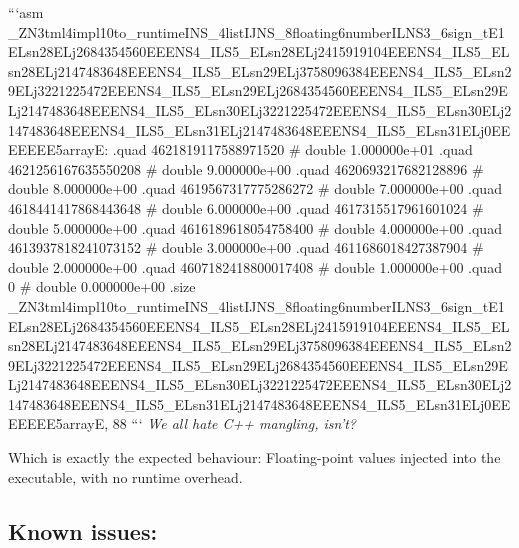 ```asm \+\_\+\+Z\+N3tml4impl10to\+\_\+runtime\+I\+N\+S\+\_\+4list\+I\+J\+N\+S\+\_\+8floating6number\+I\+L\+N\+S3\+\_\+6sign\+\_\+t\+E1\+E\+Lsn28\+E\+Lj2684354560\+E\+E\+E\+N\+S4\+\_\+\+I\+L\+S5\+\_\+E\+Lsn28\+E\+Lj2415919104\+E\+E\+E\+N\+S4\+\_\+\+I\+L\+S5\+\_\+E\+Lsn28\+E\+Lj2147483648\+E\+E\+E\+N\+S4\+\_\+\+I\+L\+S5\+\_\+E\+Lsn29\+E\+Lj3758096384\+E\+E\+E\+N\+S4\+\_\+\+I\+L\+S5\+\_\+E\+Lsn29\+E\+Lj3221225472\+E\+E\+E\+N\+S4\+\_\+\+I\+L\+S5\+\_\+E\+Lsn29\+E\+Lj2684354560\+E\+E\+E\+N\+S4\+\_\+\+I\+L\+S5\+\_\+E\+Lsn29\+E\+Lj2147483648\+E\+E\+E\+N\+S4\+\_\+\+I\+L\+S5\+\_\+E\+Lsn30\+E\+Lj3221225472\+E\+E\+E\+N\+S4\+\_\+\+I\+L\+S5\+\_\+E\+Lsn30\+E\+Lj2147483648\+E\+E\+E\+N\+S4\+\_\+\+I\+L\+S5\+\_\+E\+Lsn31\+E\+Lj2147483648\+E\+E\+E\+N\+S4\+\_\+\+I\+L\+S5\+\_\+E\+Lsn31\+E\+Lj0\+E\+E\+E\+E\+E\+E\+E5array\+E\+: .quad 4621819117588971520 \# double 1.\+000000e+01 .quad 4621256167635550208 \# double 9.\+000000e+00 .quad 4620693217682128896 \# double 8.\+000000e+00 .quad 4619567317775286272 \# double 7.\+000000e+00 .quad 4618441417868443648 \# double 6.\+000000e+00 .quad 4617315517961601024 \# double 5.\+000000e+00 .quad 4616189618054758400 \# double 4.\+000000e+00 .quad 4613937818241073152 \# double 3.\+000000e+00 .quad 4611686018427387904 \# double 2.\+000000e+00 .quad 4607182418800017408 \# double 1.\+000000e+00 .quad 0 \# double 0.\+000000e+00 .size \+\_\+\+Z\+N3tml4impl10to\+\_\+runtime\+I\+N\+S\+\_\+4list\+I\+J\+N\+S\+\_\+8floating6number\+I\+L\+N\+S3\+\_\+6sign\+\_\+t\+E1\+E\+Lsn28\+E\+Lj2684354560\+E\+E\+E\+N\+S4\+\_\+\+I\+L\+S5\+\_\+E\+Lsn28\+E\+Lj2415919104\+E\+E\+E\+N\+S4\+\_\+\+I\+L\+S5\+\_\+E\+Lsn28\+E\+Lj2147483648\+E\+E\+E\+N\+S4\+\_\+\+I\+L\+S5\+\_\+E\+Lsn29\+E\+Lj3758096384\+E\+E\+E\+N\+S4\+\_\+\+I\+L\+S5\+\_\+E\+Lsn29\+E\+Lj3221225472\+E\+E\+E\+N\+S4\+\_\+\+I\+L\+S5\+\_\+E\+Lsn29\+E\+Lj2684354560\+E\+E\+E\+N\+S4\+\_\+\+I\+L\+S5\+\_\+E\+Lsn29\+E\+Lj2147483648\+E\+E\+E\+N\+S4\+\_\+\+I\+L\+S5\+\_\+E\+Lsn30\+E\+Lj3221225472\+E\+E\+E\+N\+S4\+\_\+\+I\+L\+S5\+\_\+E\+Lsn30\+E\+Lj2147483648\+E\+E\+E\+N\+S4\+\_\+\+I\+L\+S5\+\_\+E\+Lsn31\+E\+Lj2147483648\+E\+E\+E\+N\+S4\+\_\+\+I\+L\+S5\+\_\+E\+Lsn31\+E\+Lj0\+E\+E\+E\+E\+E\+E\+E5array\+E, 88 ``` {\itshape We all hate C++ mangling, isn't?}

Which is exactly the expected behaviour\+: Floating-\/point values injected into the executable, with no runtime overhead.

\subsection*{Known issues\+:}

